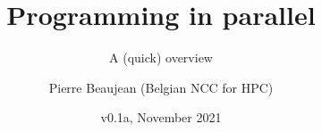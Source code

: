 \documentclass[10pt]{beamer}
\title{Programming in parallel}
\subtitle{A (quick) overview}
\author{Pierre Beaujean (Belgian NCC for HPC)}
\date{v0.1a, November 2021}
\begin{document}
	
	\maketitle

\newcommand{\cdx}[1]{\textcolor{blue!75!black!85}{\texttt{\itshape #1}}}
	






\end{document}
